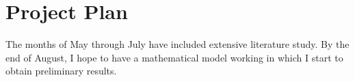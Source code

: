 \documentclass[a4paper]{article}
\begin{document}

\section{Project Plan}
The months of May through July have included extensive literature study.
By the end of August, I hope to have a mathematical model working in which I start to obtain preliminary results.




\end{document}
